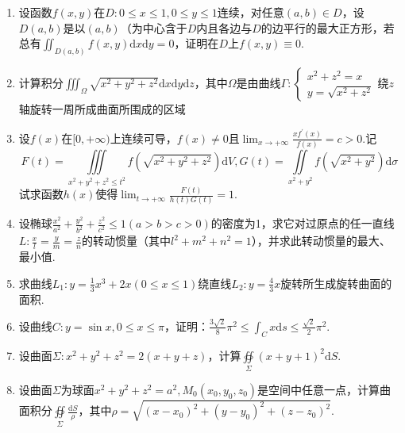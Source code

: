 \begin{enumerate}
	\item 设函数$f(x,y)$在$
	D : 0 \leqslant x \leqslant 1,0 \leqslant y \leqslant 1
	$连续，对任意$(a,b)\in D$，设$D(a,b)$是以$(a,b)$（为中心含于$D$内且各边与$D$的边平行的最大正方形，若总有$
	\iint_{D(a, b)} f(x, y) \mathrm{d} x \mathrm{d} y=0
	$，证明在$D$上$f(x, y) \equiv 0$.
	
	\item 计算积分$\iiint_{\Omega} \sqrt{x^{2}+y^{2}+z^{2}} \mathrm{d}x \mathrm{d} y \mathrm{d}z$，其中$\Omega$是由曲线$\Gamma : \left\{\begin{array}{l}{x^{2}+z^{2}=x} \\ {y=\sqrt{x^{2}+z^{2}}}\end{array}\right.$绕$z$轴旋转一周所成曲面所围成的区域
	
	\item 设$f(x)$在$[0,+\infty)$上连续可导，$f(x)\ne 0$且$\lim _{x \rightarrow+\infty} \frac{x f^{\prime}(x)}{f(x)}=c>0$.记
	\[F(t)=\iiint\limits_{x^{2}+y^{2}+z^{2} \leqslant t^{2}} f\left(\sqrt{x^{2}+y^{2}+z^{2}}\right) \mathrm{d} V,G(t)=\iint\limits_{x^{2}+y^{2}} f\left(\sqrt{x^{2}+y^{2}}\right) \mathrm{d} \sigma\]
	试求函数$h(x)$使得$\lim _{t \rightarrow+\infty} \frac{F(t)}{h(t) G(t)}=1$.
	
	\item 设椭球$\frac{x^{2}}{a^{2}}+\frac{y^{2}}{b^{2}}+\frac{z^{2}}{c^{2}} \leqslant 1(a>b>c>0)$的密度为1，求它对过原点的任一直线$L : \frac{x}{l}=\frac{y}{m}=\frac{z}{n}$的转动惯量（其中$l^{2}+m^{2}+n^{2}=1$），并求此转动惯量的最大、最小值.
	\item 求曲线$L_{1} : y=\frac{1}{3} x^{3}+2 x(0 \leqslant x \leqslant 1)$绕直线$L_{2} : y=\frac{4}{3} x$旋转所生成旋转曲面的面积.
	
	
	\item 设曲线$C : y=\sin x, 0 \leqslant x \leqslant \pi$，证明：$\frac{3 \sqrt{2}}{8} \pi^{2} \leqslant \int_{C} x \mathrm{d} s \leqslant \frac{\sqrt{2}}{2} \pi^{2}$.
	\item 设曲面$\Sigma:x^{2}+y^{2}+z^{2}=2(x+y+z)$，计算$\oiint\limits_{\Sigma}(x+y+1)^{2} \mathrm{d} S$.
	
	\item 设曲面$\Sigma$为球面$x^{2}+y^{2}+z^{2}=a^{2},  M_{0}\left(x_{0}, y_{0}, z_{0}\right)$是空间中任意一点，计算曲面积分$\oiint\limits_{\Sigma} \frac{\mathrm{d} S}{\rho}$，其中$\rho=\sqrt{\left(x-x_{0}\right)^{2}+\left(y-y_{0}\right)^{2}+\left(z-z_{0}\right)^{2}}$.
\end{enumerate}
